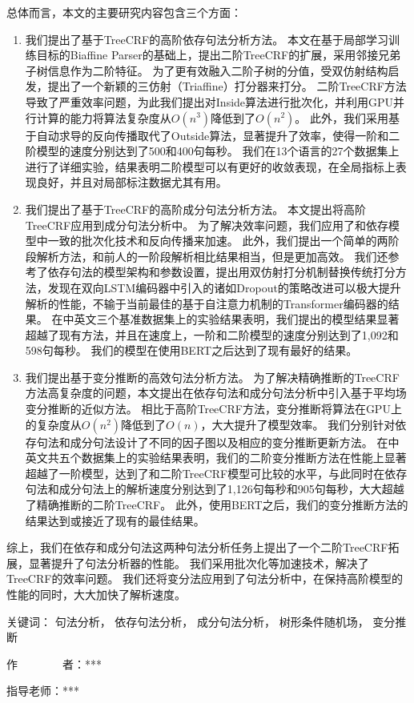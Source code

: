 \begin{cabstract}
	总体而言，本文的主要研究内容包含三个方面：
	\begin{enumerate}
		\item 我们提出了基于TreeCRF的高阶依存句法分析方法。
		      本文在基于局部学习训练目标的Biaffine Parser的基础上，提出二阶TreeCRF的扩展，采用邻接兄弟子树信息作为二阶特征。
		      为了更有效融入二阶子树的分值，受双仿射结构启发，提出了一个新颖的三仿射（Triaffine）打分器来打分。
		      二阶TreeCRF方法导致了严重效率问题，为此我们提出对Inside算法进行批次化，并利用GPU并行计算的能力将算法复杂度从$O(n^3)$降低到了$O(n^2)$。
		      此外，我们采用基于自动求导的反向传播取代了Outside算法，显著提升了效率，使得一阶和二阶模型的速度分别达到了500和400句每秒。
		      我们在13个语言的27个数据集上进行了详细实验，结果表明二阶模型可以有更好的收敛表现，在全局指标上表现良好，并且对局部标注数据尤其有用。
		\item 我们提出了基于TreeCRF的高阶成分句法分析方法。
		      本文提出将高阶TreeCRF应用到成分句法分析中。
		      为了解决效率问题，我们应用了和依存模型中一致的批次化技术和反向传播来加速。
		      此外，我们提出一个简单的两阶段解析方法，和前人的一阶段解析相比结果相当，但是更加高效。
		      我们还参考了依存句法的模型架构和参数设置，提出用双仿射打分机制替换传统打分方法，发现在双向LSTM编码器中引入的诸如Dropout的策略改进可以极大提升解析的性能，不输于当前最佳的基于自注意力机制的Transformer编码器的结果。
		      在中英文三个基准数据集上的实验结果表明，我们提出的模型结果显著超越了现有方法，并且在速度上，一阶和二阶模型的速度分别达到了1,092和598句每秒。
		      我们的模型在使用BERT之后达到了现有最好的结果。
		\item 我们提出基于变分推断的高效句法分析方法。
		      为了解决精确推断的TreeCRF方法高复杂度的问题，本文提出在依存句法和成分句法分析中引入基于平均场变分推断的近似方法。
		      相比于高阶TreeCRF方法，变分推断将算法在GPU上的复杂度从$O(n^2)$降低到了$O(n)$，大大提升了模型效率。
		      我们分别针对依存句法和成分句法设计了不同的因子图以及相应的变分推断更新方法。
		      在中英文共五个数据集上的实验结果表明，我们的二阶变分推断方法在性能上显著超越了一阶模型，达到了和二阶TreeCRF模型可比较的水平，与此同时在依存句法和成分句法上的解析速度分别达到了1,126句每秒和905句每秒，大大超越了精确推断的二阶TreeCRF。
		      此外，使用BERT之后，我们的变分推断方法的结果达到或接近了现有的最佳结果。
	\end{enumerate}
	
	综上，我们在依存和成分句法这两种句法分析任务上提出了一个二阶TreeCRF拓展，显著提升了句法分析器的性能。
	我们采用批次化等加速技术，解决了TreeCRF的效率问题。
	我们还将变分法应用到了句法分析中，在保持高阶模型的性能的同时，大大加快了解析速度。
	
	\vskip 21bp
	{\heiti{} 关键词：}
	句法分析，
	依存句法分析，
	成分句法分析，
	树形条件随机场，
	变分推断
	
	\begin{flushright}
		作~~~~~~~~者：***
		
		指导老师：***
		
	\end{flushright}
\end{cabstract}


